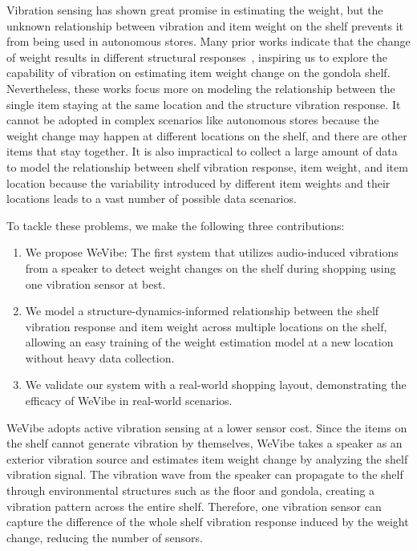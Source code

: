 Vibration sensing has shown great promise in estimating the weight, but the unknown relationship between vibration and item weight on the shelf prevents it from being used in autonomous stores. Many prior works indicate that the change of weight results in different structural responses~\cite{sekiya2018simplified,codling2021masshog,mirshekari2016characterizing, mirshekari2021obstruction}, inspiring us to explore the capability of vibration on estimating item weight change on the gondola shelf. Nevertheless, these works focus more on modeling the relationship between the single item staying at the same location and the structure vibration response. It cannot be adopted in complex scenarios like autonomous stores because the weight change may happen at different locations on the shelf, and there are other items that stay together. It is also impractical to collect a large amount of data to model the relationship between shelf vibration response, item weight, and item location because the variability introduced by different item weights and their locations leads to a vast number of possible data scenarios.

To tackle these problems, we make the following three contributions:
\begin{enumerate}[label=(\arabic*)]
  \item We propose WeVibe: The first system that utilizes audio-induced vibrations from a speaker to detect weight changes on the shelf during shopping using one vibration sensor at best.
  \item We model a structure-dynamics-informed relationship between the shelf vibration response and item weight across multiple locations on the shelf, allowing an easy training of the weight estimation model at a new location without heavy data collection.
  \item  We validate our system with a real-world shopping layout, demonstrating the efficacy of WeVibe in real-world scenarios.
\end{enumerate}
WeVibe adopts active vibration sensing at a lower sensor cost. Since the items on the shelf cannot generate vibration by themselves, WeVibe takes a speaker as an exterior vibration source and estimates item weight change by analyzing the shelf vibration signal. The vibration wave from the speaker can propagate to the shelf through environmental structures such as the floor and gondola, creating a vibration pattern across the entire shelf. Therefore, one vibration sensor can capture the difference of the whole shelf vibration response induced by the weight change, reducing the number of sensors.

